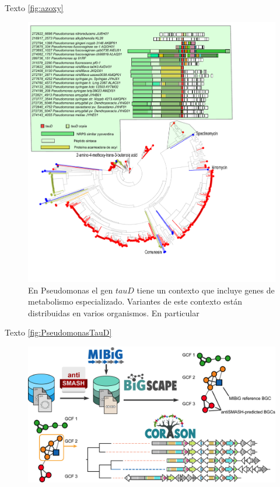 \documentclass[12pt,twoside]{reedthesis}
\begin{document}
  Texto \autoref{fig:azoxy}
  
  \begin{figure}[h!tbp]
  \centering
  \includegraphics[angle = 0,scale = .9]{chapter3/PseudomonasTauD.pdf}
  \caption[EvoMining Algorithm]{\footnotesize{En Pseudomonas el gen $tauD$ tiene un contexto que incluye genes de metabolismo especializado. Variantes de este contexto están distribuidas en varios organismos. En particular  }}
  \label{fig:PseudomonasTauD}
  \end{figure}
  
  Texto \autoref{fig:PseudomonasTauD}
  
  \begin{figure}[h!tbp]
  \centering
  \includegraphics[angle = 0,scale = .3]{chapter3/corason_fig1.png}
  \caption[EvoMining Algorithm]{\footnotesize{}}
  \label{fig:CORASONAlgorithm}
  \end{figure}
  
\end{document}
